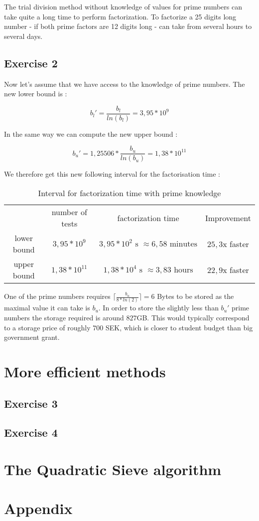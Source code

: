 \documentclass{article}
\begin{document}
The trial division method without knowledge of values for prime numbers can take quite a long time to perform factorization. To factorize a 25 digits long number - if both prime factors are 12 digits long - can take from several hours to several days.

\subsection{Exercise 2}

Now let's assume that we have access to the knowledge of prime numbers. The new lower bound is :

$$b_l'=\frac{b_l}{ln(b_l)}=3,95*10^9$$

In the same way we can compute the new upper bound :

$$b_u'=1,25506*\frac{b_u}{ln(b_u)}=1,38*10^{11}$$

We therefore get this new following interval for the factorisation time :

\begin{table}[H]
    \centering
    \begin{tabular}{c|c|c|c}
         & number of tests & factorization time & Improvement \\
        lower bound & $3,95*10^9$ & $3,95*10^{2} \text{ s } \approx 6,58 \text{ minutes}$ & $25,3$x faster \\
        upper bound & $1,38*10^{11}$ & $1,38*10^{4} \text{ s } \approx 3,83 \text{ hours}$ & $22,9$x faster
    \end{tabular}
    \caption{Interval for factorization time with prime knowledge}
\end{table}

One of the prime numbers requires $\lceil\frac{b_u}{8*ln(2)}\rceil=6$ Bytes to be stored as the maximal value it can take is $b_u$. In order to store the slightly less than $b_u'$ prime numbers the storage required is around $827$GB. This would typically correspond to a storage price of roughly $700$ SEK, which is closer to student budget than big government grant.

\section{More efficient methods}

\subsection{Exercise 3}

\subsection{Exercise 4}

\section{The Quadratic Sieve algorithm}

\section{Appendix}
\end{document}
